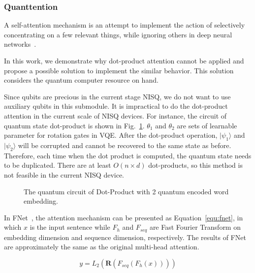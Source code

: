 \subsubsection{Quanttention}
A self-attention mechanism is an attempt to implement the action of selectively concentrating on a few relevant things, while ignoring others in deep neural networks~\cite{}.

In this work, we demonstrate why dot-product attention cannot be applied and propose a possible solution to implement the similar behavior. This solution considers the quantum computer resource on hand.

Since qubits are precious in the current stage NISQ, we do not want to use auxiliary qubits in this submodule. It is impractical to do the dot-product attention in the current scale of NISQ devices. For instance, the circuit of quantum state dot-product is shown in Fig.~\ref{fig:dot-product}. $\theta_1$ and $\theta_2$ are sets of learnable parameter for rotation gates in VQE. After the dot-product operation, $|\psi_1\rangle$ and $|\psi_2\rangle$ will be corrupted and cannot be recovered to the same state as before. Therefore, each time when the dot product is computed, the quantum state needs to be duplicated. There are at least $O(n \times d)$ dot-products, so this method is not feasible in the current NISQ device.

\begin{figure}[htp!]
  \centering
  \caption{The quantum circuit of Dot-Product with 2 quantum encoded word embedding.}
  \label{fig:dot-product}
\end{figure}


In FNet~\cite{}, the attention mechanism can be presented as Equation~\ref{equ:fnet}, in which $x$ is the input sentence while $F_h$ and $F_{seq}$ are Fast Fourier Transform on embedding dimension and sequence dimension, respectively. The results of FNet are approximately the same as the original multi-head attention.

\begin{equation} \label{equ:fnet}
y =  L_2(\mathbf{R}(F_{seq}(F_h(x))))
\end{equation}

